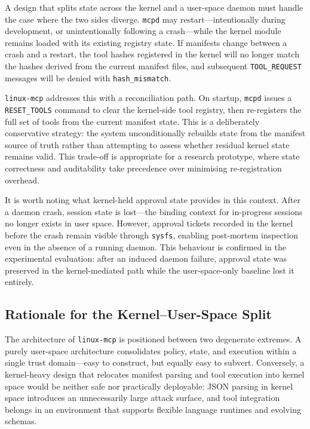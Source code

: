 A design that splits state across the kernel and a user-space daemon must handle the case where the two sides diverge.
\texttt{mcpd} may restart---intentionally during development, or unintentionally following a crash---while the kernel module remains loaded with its existing registry state.
If manifests change between a crash and a restart, the tool hashes registered in the kernel will no longer match the hashes derived from the current manifest files, and subsequent \texttt{TOOL\_REQUEST} messages will be denied with
\texttt{hash\_mismatch}.

\texttt{linux-mcp} addresses this with a reconciliation path.
On startup, \texttt{mcpd} issues a \texttt{RESET\_TOOLS} command to clear the kernel-side tool registry, then re-registers the full set of tools from the current manifest state.
This is a deliberately conservative strategy: the system unconditionally rebuilds state from the manifest source of truth rather than attempting to assess whether residual kernel state remains valid.
This trade-off is appropriate for a research prototype, where state correctness and auditability take precedence over minimising re-registration overhead.

It is worth noting what kernel-held approval state provides in this context.
After a daemon crash, session state is lost---the binding context for in-progress sessions no longer exists in user space.
However, approval tickets recorded in the kernel before the crash remain visible through \texttt{sysfs}, enabling post-mortem inspection even in the absence of a running daemon.
This behaviour is confirmed in the experimental evaluation: after an induced daemon failure, approval state was preserved in the kernel-mediated path while the user-space-only baseline lost it entirely.



\subsection{Rationale for the Kernel--User-Space Split}

The architecture of \texttt{linux-mcp} is positioned between two degenerate extremes.
A purely user-space architecture consolidates policy, state, and execution within a single trust domain---easy to construct, but equally easy to subvert.
Conversely, a kernel-heavy design that relocates manifest parsing and tool execution into kernel space would be neither safe nor practically deployable: JSON parsing in kernel space introduces an unnecessarily large attack surface, and tool integration belongs in an environment that supports flexible language runtimes and evolving schemas.

